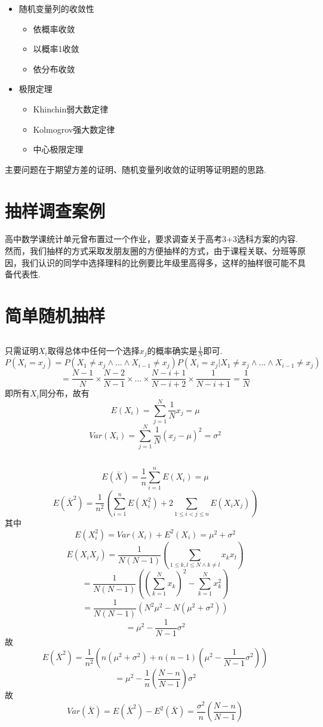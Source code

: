 \documentclass{article}
\begin{document}
\begin{CJK}{UTF8}{gbsn}
\begin{itemize}
\begin{itemize}
        \item 随机变量列的收敛性
        \begin{itemize}
            \item 依概率收敛
            \item 以概率1收敛
            \item 依分布收敛
        \end{itemize}
        \item 极限定理
        \begin{itemize}
            \item Khinchin弱大数定律
            \item Kolmogrov强大数定律
            \item 中心极限定理
        \end{itemize}
    \end{itemize}
\end{itemize}
主要问题在于期望方差的证明、随机变量列收敛的证明等证明题的思路.
\section{抽样调查案例}
高中数学课统计单元曾布置过一个作业，要求调查关于高考3+3选科方案的内容. 然而，我们抽样的方式采取发朋友圈的方便抽样的方式，由于课程关联、分班等原因，我们认识的同学中选择理科的比例要比年级里高得多，这样的抽样很可能不具备代表性.
\section{简单随机抽样}
\subsection{}
只需证明$X_{i}$取得总体中任何一个选择$x_{j}$的概率确实是$\frac{1}{N}$即可.
$$ P(X_{i}=x_{j})=P(X_{1}\neq x_{j}\land ...\land X_{i-1}\neq x_{j})P(X_{i}=x_{j}|X_{1}\neq x_{j}\land...\land X_{i-1}\neq x_{j})$$
$$ =\frac{N-1}{N}\times\frac{N-2}{N-1}\times ... \times\frac{N-i+1}{N-i+2}\times\frac{1}{N-i+1}=\frac{1}{N}$$
即所有$X_{i}$同分布，故有
$$ E(X_{i})=\sum\limits_{j=1}^{N}\frac{1}{N}x_{j}=\mu$$
$$ Var(X_{i})=\sum\limits_{j=1}^{N}\frac{1}{N}(x_{j}-\mu)^{2}=\sigma^{2}$$
\subsection{}
$$ E(\bar{X})=\frac{1}{n}\sum\limits_{i=1}^{n}E(X_{i})=\mu$$
$$ E(\bar{X}^{2})=\frac{1}{n^{2}}(\sum\limits_{i=1}^{n}E(X_{i}^{2})+2\sum\limits_{1\leq i<j\leq n}E(X_{i}X_{j}))$$
其中
$$ E(X_{i}^{2})=Var(X_{i})+E^{2}(X_{i})=\mu^{2}+\sigma^{2}$$
$$ E(X_{i}X_{j})=\frac{1}{N(N-1)}(\sum\limits_{1\leq k,l\leq N\land k\neq l}x_{k}x_{l})$$
$$ =\frac{1}{N(N-1)}((\sum\limits_{k=1}^{N}x_{k})^{2}-\sum\limits_{k=1}^{N}x_{k}^{2})$$
$$ =\frac{1}{N(N-1)}(N^{2}\mu^{2}-N(\mu^{2}+\sigma^{2}))$$
$$ =\mu^{2}-\frac{1}{N-1}\sigma^{2}$$
故
$$ E(\bar{X}^{2})=\frac{1}{n^{2}}(n(\mu^{2}+\sigma^{2})+n(n-1)(\mu^{2}-\frac{1}{N-1}\sigma^{2}))$$
$$ =\mu^{2}-\frac{1}{n}(\frac{N-n}{N-1})\sigma^{2}$$
故
$$ Var(\bar{X})=E(\bar{X}^{2})-E^{2}(\bar{X})=\frac{\sigma^{2}}{n}(\frac{N-n}{N-1})$$

\end{CJK}
\end{document}
